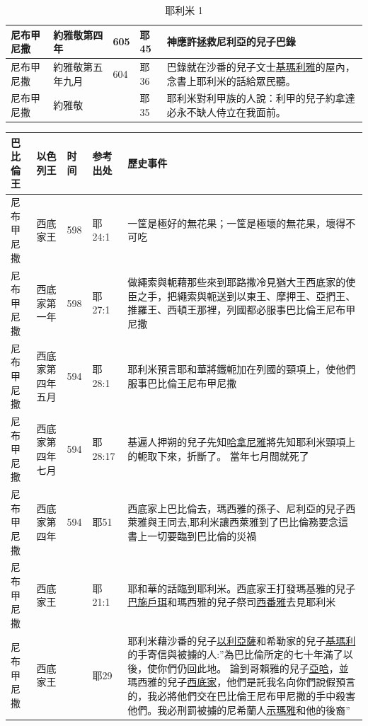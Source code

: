 \begin{table}[!hbp]
\begin{tabular}{|p{1.8cm}|p{2cm}|p{1.5cm}|p{1.7cm}|p{8.5cm}| }
  
   尼布甲尼撒 & 約雅敬第四年& 605 &耶45   &神應許拯救尼利亞的兒子巴錄\\\hline
   
         尼布甲尼撒 & 約雅敬第五年九月& 604 &耶36   &巴錄就在沙番的兒子文士\underline{基瑪利雅}的屋內，念書上耶利米的話給眾民聽。\\\hline
      
       
  尼布甲尼撒& 約雅敬&  &耶35  &耶利米對利甲族的人說：利甲的兒子約拿達必永不缺人侍立在我面前。  \\\hline    
   
\end{tabular}
\caption{耶利米 1}
\end{table}



\begin{table}[!hbp]
\centering 
\begin{tabular}{|p{1.8cm}|p{2cm}|p{1.5cm}|p{1.7cm}|p{8.5cm}| }
\hline
\hline
巴比倫王 &以色列王  & 时间 &参考出处 & 歷史事件   \\\hline
尼布甲尼撒& 西底家王&598  &耶24:1 &一筐是極好的無花果；一筐是極壞的無花果，壞得不可吃  \\\hline 
 尼布甲尼撒 &西底家第一年 &598&耶27:1  &做繩索與軛藉那些來到耶路撒冷見猶大王西底家的使臣之手，把繩索與軛送到以東王、摩押王、亞捫王、推羅王、西頓王那裡，列國都必服事巴比倫王尼布甲尼撒              \\\hline    
 

 
 尼布甲尼撒 &西底家第四年五月 &594&耶28:1  & 耶利米預言耶和華將鐵軛加在列國的頸項上，使他們服事巴比倫王尼布甲尼撒   \\\hline 
 尼布甲尼撒 &西底家第四年七月 &594&耶28:17  & 基遍人押朔的兒子先知\underline{哈拿尼雅}將先知耶利米頸項上的軛取下來，折斷了。 當年七月間就死了   \\\hline  
  尼布甲尼撒 &西底家第四年  &594&耶51  & 西底家上巴比倫去，瑪西雅的孫子、尼利亞的兒子西萊雅與王同去,耶利米讓西萊雅到了巴比倫務要念這書上一切要臨到巴比倫的災禍  \\\hline 
 尼布甲尼撒& 西底家王&  &耶21:1  & 耶和華的話臨到耶利米。西底家王打發瑪基雅的兒子\underline{巴施戶珥}和瑪西雅的兒子祭司\underline{西番雅}去見耶利米\\\hline
尼布甲尼撒& 西底家王&  &耶29  & 耶利米藉沙番的兒子\underline{以利亞薩}和希勒家的兒子\underline{基瑪利}的手寄信與被擄的人:''為巴比倫所定的七十年滿了以後，使你們仍回此地。 論到哥賴雅的兒子\underline{亞哈}，並瑪西雅的兒子\underline{西底家}，他們是託我名向你們說假預言的，我必將他們交在巴比倫王尼布甲尼撒的手中殺害他們。我必刑罰被擄的尼希蘭人\underline{示瑪雅}和他的後裔''\\\hline


\end{tabular}
\end{table}
